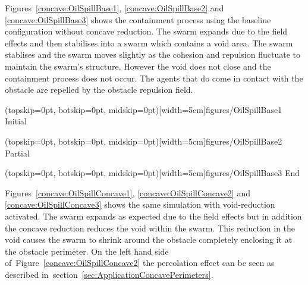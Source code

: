\documentclass{ieeeaccess}
\begin{document}
Figures~\ref{concave:OilSpillBase1}, \ref{concave:OilSpillBase2} and \ref{concave:OilSpillBase3} shows the containment process using the baseline configuration without concave reduction. The swarm expands due to the field effects and then stabilises into a swarm which contains a void area. The swarm stablises and the swarm moves slightly as the cohesion and repulsion fluctuate to maintain the swarm's structure. However the void does not close and the containment process does not occur. The agents that do come in contact with the obstacle are repelled by the obstacle repulsion field.

\Figure[t!](topskip=0pt, botskip=0pt, midskip=0pt)[width=5cm]{figures/OilSpillBase1}
{Initial\label{concave:OilSpillBase1}}


\Figure[t!](topskip=0pt, botskip=0pt, midskip=0pt)[width=5cm]{figures/OilSpillBase2}
{Partial\label{concave:OilSpillBase2}}


\Figure[t!](topskip=0pt, botskip=0pt, midskip=0pt)[width=5cm]{figures/OilSpillBase3}
{End\label{concave:OilSpillBase3}}


Figures~\ref{concave:OilSpillConcave1}, \ref{concave:OilSpillConcave2} and \ref{concave:OilSpillConcave3} shows the same simulation with void-reduction activated. The swarm expands as expected due to the field effects but in addition the concave reduction reduces the void within the swarm. This reduction in the void causes the swarm to shrink around the obstacle completely enclosing it at the obstacle perimeter. On the left hand side of~Figure~\ref{concave:OilSpillConcave2} the percolation effect can be seen as described in~section~\ref{sec:ApplicationConcavePerimeters}.
\end{document}
